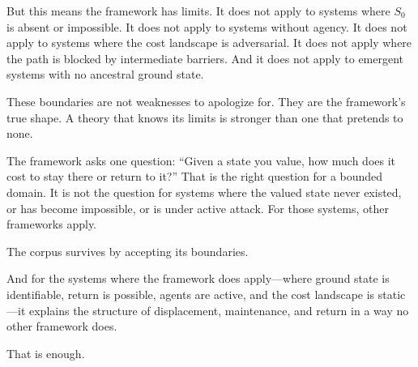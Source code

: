 \documentclass[12pt]{article}
\begin{document}
But this means the framework has limits. It does not apply to systems where $S_0$ is absent or impossible. It does not apply to systems without agency. It does not apply to systems where the cost landscape is adversarial. It does not apply where the path is blocked by intermediate barriers. And it does not apply to emergent systems with no ancestral ground state.

These boundaries are not weaknesses to apologize for. They are the framework's true shape. A theory that knows its limits is stronger than one that pretends to none.

The framework asks one question: ``Given a state you value, how much does it cost to stay there or return to it?'' That is the right question for a bounded domain. It is not the question for systems where the valued state never existed, or has become impossible, or is under active attack. For those systems, other frameworks apply.

The corpus survives by accepting its boundaries.

And for the systems where the framework does apply—where ground state is identifiable, return is possible, agents are active, and the cost landscape is static—it explains the structure of displacement, maintenance, and return in a way no other framework does.

That is enough.
\end{document}

